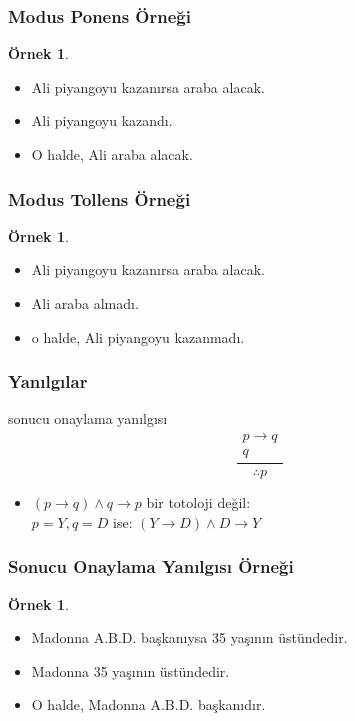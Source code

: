 \documentclass[dvipsnames]{beamer}
\theoremstyle{definition}
\theoremstyle{example}
\newtheorem{ornek}[theorem]{Örnek}
\theoremstyle{plain}
\begin{document}
\begin{frame}
  \frametitle{Modus Ponens Örneği}

  \begin{ornek}
    \begin{itemize}
      \item Ali piyangoyu kazanırsa araba alacak.
      \item Ali piyangoyu kazandı.

      \pause
      \medskip
      \item O halde, Ali araba alacak.
    \end{itemize}
  \end{ornek}
\end{frame}

\begin{frame}
  \frametitle{Modus Tollens Örneği}

  \begin{ornek}
    \begin{itemize}
      \item Ali piyangoyu kazanırsa araba alacak.
      \item Ali araba almadı.

      \pause
      \medskip
      \item o halde, Ali piyangoyu kazanmadı.
    \end{itemize}
  \end{ornek}
\end{frame}

\begin{frame}
  \frametitle{Yanılgılar}

  \begin{block}{sonucu onaylama yanılgısı}
    \[
    \frac
      {
      \begin{array}{c}
        p \rightarrow q\\
        q
        \end{array}
      }
      {
        \therefore p
      }
    \]
  \end{block}

  \pause
  \begin{itemize}
    \item $(p \rightarrow q) \wedge q \rightarrow p$ bir totoloji değil:\\
      $p=Y,q=D$ ise: $(Y \rightarrow D) \wedge D \rightarrow Y$
  \end{itemize}
\end{frame}

\begin{frame}
  \frametitle{Sonucu Onaylama Yanılgısı Örneği}

  \begin{ornek}
    \begin{itemize}
      \item Madonna A.B.D. başkanıysa 35 yaşının üstündedir.
      \item Madonna 35 yaşının üstündedir.

      \pause
      \medskip
      \item O halde, Madonna A.B.D. başkanıdır.
    \end{itemize}
  \end{ornek}
\end{frame}
\end{document}

